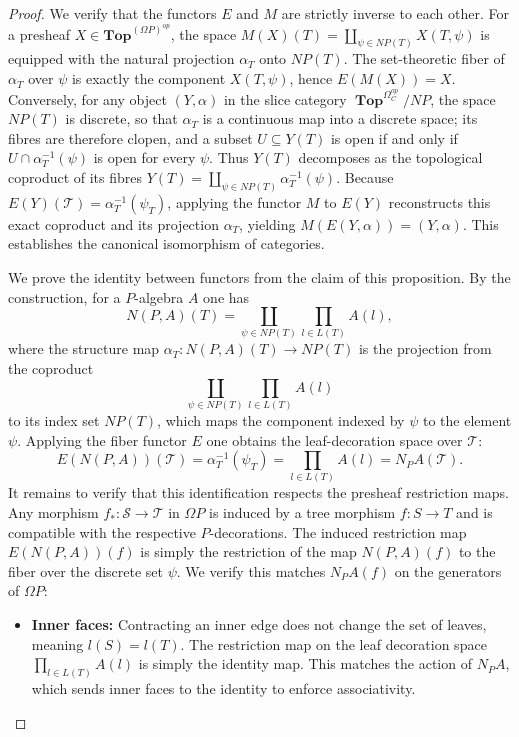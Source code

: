 \documentclass{amsart}
\theoremstyle{definition}
\theoremstyle{remark}
\DeclareMathOperator{\Top}{\mathbf{Top}}
\begin{document}
\begin{proof}
	We verify that the functors $E$ and $M$ are strictly inverse to each other. 
	For a presheaf $X \in \mathbf{Top}^{(\Omega P)^{op}}$, the space $M(X)(T) = \coprod_{\psi \in NP(T)} X(T, \psi)$ is equipped with the natural projection $\alpha_T$ onto $NP(T)$. 
	The set-theoretic fiber of $\alpha_T$ over $\psi$ is exactly the component $X(T,\psi)$, hence $E(M(X)) = X$. 
	Conversely, for any object $(Y, \alpha)$ in the slice category $\Top^{\Omega_C^{op}}/NP$, the space $NP(T)$ is discrete, so that $\alpha_T$ is a continuous map into a
	discrete space; its fibres are therefore clopen, and a subset $U\subseteq Y(T)$
	is open if and only if $U\cap\alpha_T^{-1}(\psi)$ is open for every $\psi$.
	Thus $Y(T)$ decomposes as the topological coproduct of its fibres 
	$Y(T) = \coprod_{\psi \in NP(T)} \alpha_T^{-1}(\psi)$. 
	Because $E(Y)(\mathcal{T}) = \alpha_T^{-1}(\psi_{T})$, applying the functor $M$ to $E(Y)$ reconstructs this exact coproduct and its projection $\alpha_T$, yielding $M(E(Y, \alpha)) = (Y, \alpha)$. 
	This establishes the canonical isomorphism of categories.		
	
	We prove the identity between functors from the claim of this proposition.
	By the construction, for a $P$-algebra $A$ one has 
	\[
		N(P,A)(T) = \coprod_{\psi \in NP(T)} \prod_{l \in L(T)} A(l),
	\]
	where the structure map $\alpha_T \colon N(P, A)(T) \to NP(T)$ is the projection from the coproduct 
	\[
		\coprod_{\psi \in NP(T)} \prod_{l \in L(T)} A(l)
	\] 
	to its index set $NP(T)$, which maps the component indexed by $\psi$ to the element $\psi$. 
	Applying the fiber functor $E$ one obtains the leaf-decoration space over $\mathcal{T}$:
	\[
		E(N(P, A))(\mathcal{T}) = 	\alpha_T^{-1}(\psi_{T}) = \prod_{l \in L(T)} A(l) = N_P A(\mathcal{T}).
	\]
	It remains to verify that this identification respects the presheaf restriction maps. 
	Any morphism $f_{*}\colon \mathcal{S} \to \mathcal{T}$ in $\Omega P$ is induced by a tree morphism $f\colon S \to T$ and  is compatible with the respective $P$-decorations. 
	The induced restriction map $E(N(P, A))(f)$ is simply the restriction of the map $N(P, A)(f)$ to the fiber over the discrete set $\psi$. 
	We verify this matches $N_P A(f)$ on the generators of $\Omega P$:
	\begin{itemize}
		\item \textbf{Inner faces:} Contracting an inner edge does not change the set of leaves, meaning $l(S) = l(T)$. 
		The restriction map on the leaf decoration space $\prod_{l \in L(T)} A(l)$ is simply the identity map. 
		This matches the action of $N_P A$, which sends inner faces to the identity to enforce associativity.
		

\end{itemize}
\end{proof}
\end{document}
